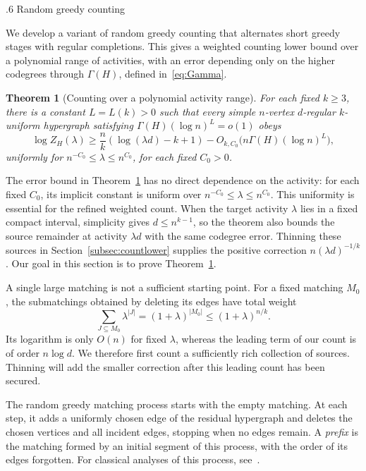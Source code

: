 \documentclass[11pt,reqno]{amsart}
\makeatletter
\numberwithin{equation}{section}
\renewcommand{\section}{\@startsection{section}{1}%
    \z@{1.3\linespacing\@plus.5\linespacing\@minus.2\linespacing}%
    {.6\linespacing}%
    {\normalfont\scshape\centering}}
\theoremstyle{plain}
\newtheorem{theorem}{Theorem}[section]
\theoremstyle{definition}
\makeatother
\begin{document}

\section{Random greedy counting}\label{sec:greedy}

We develop a variant of random greedy counting that alternates short greedy stages with regular completions.
This gives a weighted counting lower bound over a polynomial range of activities, with an error depending only on the higher codegrees through $\Gamma(H)$, defined in~\eqref{eq:Gamma}.

\begin{theorem}[Counting over a polynomial activity range]\label{thm:greedycount}
    For each fixed $k\ge3$, there is a constant $L=L(k)>0$ such that every simple $n$-vertex $d$-regular $k$-uniform hypergraph satisfying $\Gamma(H)(\log n)^L=o(1)$ obeys
    \[
        \log Z_H(\lambda)\ge\frac nk(\log(\lambda d)-k+1)-O_{k,C_0}\bigl(n\Gamma(H)(\log n)^L\bigr),
    \]
    uniformly for $n^{-C_0}\le \lambda\le n^{C_0}$, for each fixed $C_0>0$.
\end{theorem}

The error bound in Theorem~\ref{thm:greedycount} has no direct dependence on the activity: for each fixed $C_0$, its implicit constant is uniform over $n^{-C_0}\le\lambda\le n^{C_0}$.
This uniformity is essential for the refined weighted count.
When the target activity $\lambda$ lies in a fixed compact interval, simplicity gives $d\le n^{k-1}$, so the theorem also bounds the source remainder at activity $\lambda d$ with the same codegree error.
Thinning these sources in Section~\ref{subsec:countlower} supplies the positive correction $n(\lambda d)^{-1/k}$.
Our goal in this section is to prove Theorem~\ref{thm:greedycount}.

A single large matching is not a sufficient starting point.
For a fixed matching $M_0$, the submatchings obtained by deleting its edges have total weight
\[
    \sum_{J\subseteq M_0}\lambda^{|J|} =(1+\lambda)^{|M_0|}\le(1+\lambda)^{n/k}.
\]
Its logarithm is only $O(n)$ for fixed $\lambda$, whereas the leading term of our count is of order $n\log d$.
We therefore first count a sufficiently rich collection of sources.
Thinning will add the smaller correction after this leading count has been secured.

The random greedy matching process starts with the empty matching.
At each step, it adds a uniformly chosen edge of the residual hypergraph and deletes the chosen vertices and all incident edges, stopping when no edges remain.
A \emph{prefix} is the matching formed by an initial segment of this process, with the order of its edges forgotten.
For classical analyses of this process, see~\cite{SpencerPacking,RodlThoma}.
\end{document}
